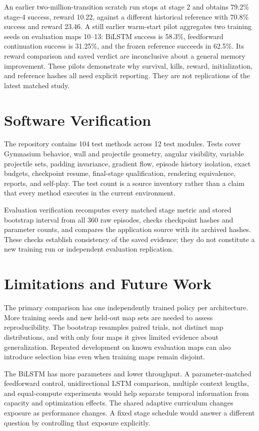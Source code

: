 \documentclass[conference]{IEEEtran}
\begin{document}
An earlier two-million-transition scratch run stops at stage 2 and obtains 79.2\% stage-4 success, reward 10.22, against a different historical reference with 70.8\% success and reward 23.46. A still earlier warm-start pilot aggregates two training seeds on evaluation maps 10--13: BiLSTM success is 58.3\%, feedforward continuation success is 31.25\%, and the frozen reference succeeds in 62.5\%. Its reward comparison and saved verdict are inconclusive about a general memory improvement. These pilots demonstrate why survival, kills, reward, initialization, and reference hashes all need explicit reporting. They are not replications of the latest matched study.

\section{Software Verification}
The repository contains 104 test methods across 12 test modules. Tests cover Gymnasium behavior, wall and projectile geometry, angular visibility, variable projectile sets, padding invariance, gradient flow, episode history isolation, exact budgets, checkpoint resume, final-stage qualification, rendering equivalence, reports, and self-play. The test count is a source inventory rather than a claim that every method executes in the current environment.



Evaluation verification recomputes every matched stage metric and stored bootstrap interval from all 360 raw episodes, checks checkpoint hashes and parameter counts, and compares the application source with its archived hashes. These checks establish consistency of the saved evidence; they do not constitute a new training run or independent evaluation replication.

\section{Limitations and Future Work}
The primary comparison has one independently trained policy per architecture. More training seeds and new held-out map sets are needed to assess reproducibility. The bootstrap resamples paired trials, not distinct map distributions, and with only four maps it gives limited evidence about generalization. Repeated development on known evaluation maps can also introduce selection bias even when training maps remain disjoint.

The BiLSTM has more parameters and lower throughput. A parameter-matched feedforward control, unidirectional LSTM comparison, multiple context lengths, and equal-compute experiments would help separate temporal information from capacity and optimization effects. The shared adaptive curriculum changes exposure as performance changes. A fixed stage schedule would answer a different question by controlling that exposure explicitly.
\end{document}
